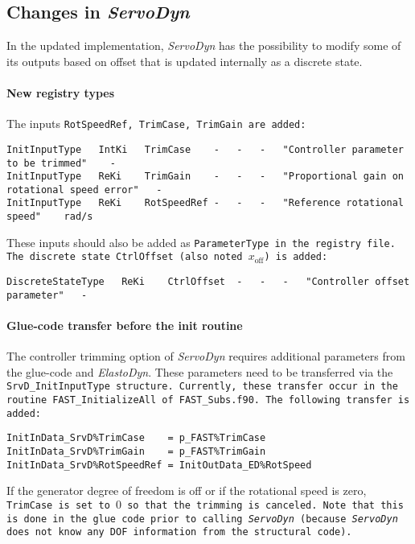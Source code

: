 \documentclass[11pt]{article}
\begin{document}
\subsection{Changes in \textit{ServoDyn}}
\label{sec:changesservodyn}
In the updated implementation, \textit{ServoDyn} has the possibility to modify some of its outputs based on offset that is updated internally as a discrete state.

\paragraph{New registry types}
The inputs \tt{RotSpeedRef}, \tt{TrimCase}, \tt{TrimGain} are added: 
\fortran
\begin{lstlisting}
InitInputType	IntKi	TrimCase	-	-	-	"Controller parameter to be trimmed"	-
InitInputType	ReKi	TrimGain	-	-	-	"Proportional gain on rotational speed error"	-
InitInputType	ReKi	RotSpeedRef	-	-	-	"Reference rotational speed"	rad/s
\end{lstlisting}
These inputs should also be added as \tt{ParameterType} in the registry file.
The discrete state \tt{CtrlOffset} (also noted $x_\text{off}$) is added: 
\begin{lstlisting}
DiscreteStateType	ReKi	CtrlOffset	-	-	-	"Controller offset parameter"	-
\end{lstlisting}


\paragraph{Glue-code transfer before the init routine}
The controller trimming option of \textit{ServoDyn} requires additional parameters from the glue-code and \textit{ElastoDyn}. These parameters need to be transferred via the \tt{SrvD\_InitInputType} structure.
Currently, these transfer occur in the routine \tt{FAST\_InitializeAll} of \tt{FAST\_Subs.f90}. 
The following transfer is added: 
\fortran
\begin{lstlisting}
InitInData_SrvD%TrimCase    = p_FAST%TrimCase
InitInData_SrvD%TrimGain    = p_FAST%TrimGain
InitInData_SrvD%RotSpeedRef = InitOutData_ED%RotSpeed
\end{lstlisting}
If the generator degree of freedom is off or if the rotational speed is zero, \tt{TrimCase} is set to $0$ so that the trimming is canceled.
Note that this is done in the glue code prior to calling \textit{ServoDyn} (because \textit{ServoDyn} does not know any DOF information from
the structural code).
\end{document}
